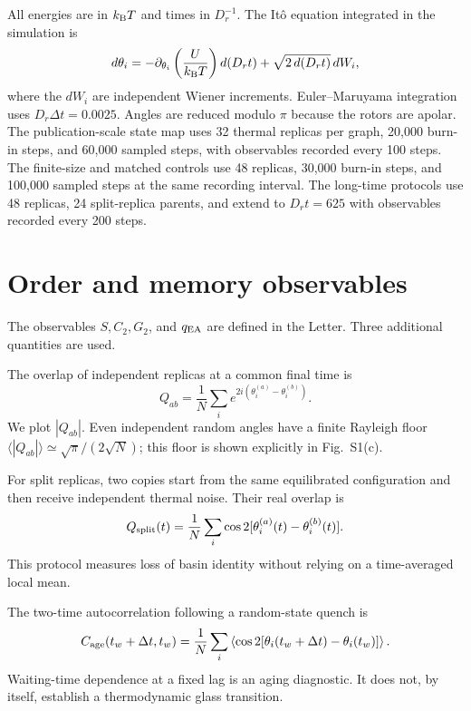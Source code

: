 \documentclass[aps,prl,onecolumn,superscriptaddress,nofootinbib]{revtex4-2}
\begin{document}
All energies are in \(k_{\rm B}T\) and times in \(D_r^{-1}\).  The It\^{o}
equation integrated in the simulation is
\begin{equation}
 d\theta_i=
 -\partial_{\theta_i}\left(\frac{U}{k_{\rm B}T}\right)d(D_rt)
 +\sqrt{2\,d(D_rt)}\,dW_i,
 \label{eq:supp-langevin}
\end{equation}
where the \(dW_i\) are independent Wiener increments.  Euler--Maruyama
integration uses \(D_r\Delta t=0.0025\).  Angles are reduced modulo \(\pi\)
because the rotors are apolar.  The publication-scale state map uses 32
thermal replicas per graph, 20,000 burn-in steps, and 60,000 sampled steps,
with observables recorded every 100 steps.  The finite-size and matched
controls use 48 replicas, 30,000 burn-in steps, and 100,000 sampled steps at
the same recording interval.  The long-time protocols use 48 replicas, 24
split-replica parents, and extend to \(D_rt=625\) with observables recorded
every 200 steps.

\section{Order and memory observables}

The observables \(S,C_2,G_2\), and \(q_{\rm EA}\) are defined in the Letter.
Three additional quantities are used.

The overlap of independent replicas at a common final time is
\begin{equation}
 Q_{ab}=\frac{1}{N}\sum_i e^{2i(\theta_i^{(a)}-\theta_i^{(b)})}.
 \label{eq:supp-replica}
\end{equation}
We plot \(|Q_{ab}|\).  Even independent random angles have a finite
Rayleigh floor
\(\langle|Q_{ab}|\rangle\simeq\sqrt{\pi}/(2\sqrt{N})\); this floor is shown
explicitly in Fig.~S1(c).

For split replicas, two copies start from the same equilibrated configuration
and then receive independent thermal noise.  Their real overlap is
\begin{equation}
 Q_{\rm split}(t)=\frac{1}{N}\sum_i
 \cos2[\theta_i^{(a)}(t)-\theta_i^{(b)}(t)].
 \label{eq:supp-split}
\end{equation}
This protocol measures loss of basin identity without relying on a
time-averaged local mean.

The two-time autocorrelation following a random-state quench is
\begin{equation}
 C_{\rm age}(t_w+\Delta t,t_w)=
 \frac{1}{N}\sum_i
 \left\langle\cos2[\theta_i(t_w+\Delta t)-\theta_i(t_w)]\right\rangle.
 \label{eq:supp-aging}
\end{equation}
Waiting-time dependence at a fixed lag is an aging diagnostic.  It does not,
by itself, establish a thermodynamic glass transition.
\end{document}
